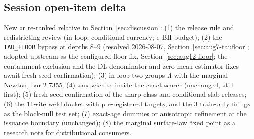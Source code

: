 \subsection{Session open-item delta}\label{sec:aug6-open}

New or re-ranked relative to Section~\ref{sec:discussion}: (1) the release
rule and redistricting review (in-loop; conditional currency; e-BH budget);
(2) the \texttt{TAU\_FLOOR} bypass at depths 8--9 (resolved 2026-08-07,
Section~\ref{sec:aug7-taufloor}; adopted upstream as the configured-floor
fix, Section~\ref{sec:aug12-floor}; the
containment exclusion and the DL-denominator and zero-mean estimator fixes
await fresh-seed confirmation); (3) in-loop
two-groups $\Lambda$ with the marginal Newton, bar 2.7355; (4) sandwich se
inside the exact scorer (unchanged, still first); (5) fresh-seed confirmation
of the sharp-class and conditional-slab releases; (6) the 11-site weld docket
with pre-registered targets, and the 3 train-only firings as the block-null
test set; (7) exact-age dummies or anisotropic refinement at the issuance
boundary (unchanged); (8) the marginal surface-law fixed point as a
research note for distributional consumers.
